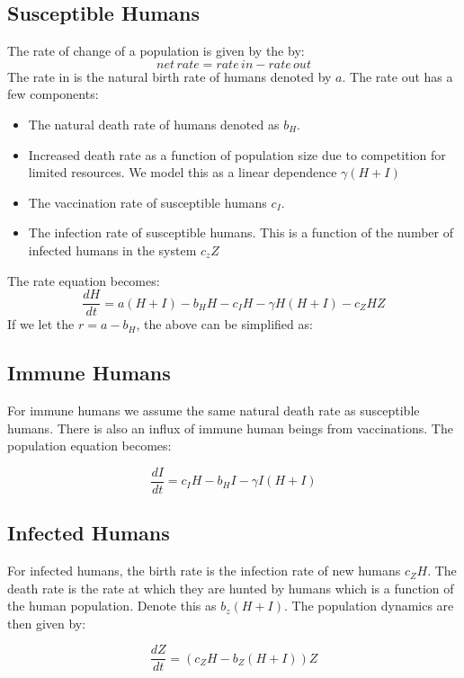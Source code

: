 \documentclass[
	12pt
]{article}
\begin{document}
\subsection{Susceptible Humans}
The rate of change of a population is given by the by:
\begin{equation}
net \, rate = rate \, in - rate \, out
\end{equation}
The rate in is the natural birth rate of humans denoted by $a$. The rate out has a few components:
\begin{itemize}
\item The natural death rate of humans denoted as $b_H$.
\item Increased death rate as a function of population size due to competition for limited resources. We model this as a linear dependence $\gamma(H+I)$
\item The vaccination rate of susceptible humans $c_I$.
\item The infection rate of susceptible humans. This is a function of the number of infected humans in the system $c_zZ$
\end{itemize}
The rate equation becomes:
\begin{equation}
\frac{dH}{dt} = a(H+I)-b_HH-c_IH-\gamma H(H+I)-c_ZHZ
\end{equation}
If we let the $r = a-b_H$, the above can be simplified as:

\subsection{Immune Humans}
For immune humans we assume the same natural death rate as susceptible humans. There is also an influx of immune human beings from vaccinations. The population equation becomes:

\begin{equation}
\frac{dI}{dt} = c_IH-b_HI-\gamma I(H+I)
\end{equation}

\subsection{Infected Humans}
For infected humans, the birth rate is the infection rate of new humans $c_ZH$. The death rate is the rate at which they are hunted by humans which is a function of the human population. Denote this as $b_z(H+I)$. The population dynamics are then given by:

\begin{equation}
\frac{dZ}{dt} = (c_ZH-b_Z(H+I))Z
\end{equation}
\end{document}
